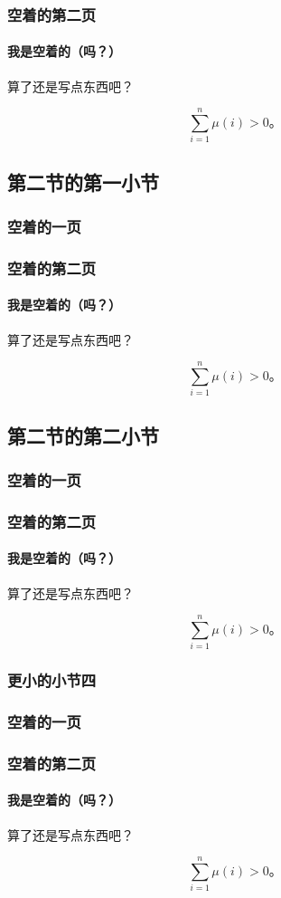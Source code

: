 \documentclass{../pkslide}
\begin{document}
\begin{frame}
  \frametitle{空着的第二页}
  \framesubtitle{我是空着的（吗？）}
  
  算了还是写点东西吧？
  
  \[ \sum_{i = 1}^{n} \mu(i) > 0 \text{。} \]
\end{frame}

\subsection{第二节的第一小节}

\begin{frame}
  \frametitle{空着的一页}
\end{frame}

\begin{frame}
  \frametitle{空着的第二页}
  \framesubtitle{我是空着的（吗？）}
  
  算了还是写点东西吧？
  
  \[ \sum_{i = 1}^{n} \mu(i) > 0 \text{。} \]
\end{frame}

\subsection{第二节的第二小节}

\begin{frame}
  \frametitle{空着的一页}
\end{frame}

\begin{frame}
  \frametitle{空着的第二页}
  \framesubtitle{我是空着的（吗？）}
  
  算了还是写点东西吧？
  
  \[ \sum_{i = 1}^{n} \mu(i) > 0 \text{。} \]
\end{frame}

\subsubsection{更小的小节四}

\begin{frame}
  \frametitle{空着的一页}
\end{frame}

\begin{frame}
  \frametitle{空着的第二页}
  \framesubtitle{我是空着的（吗？）}
  
  算了还是写点东西吧？
  
  \[ \sum_{i = 1}^{n} \mu(i) > 0 \text{。} \]
\end{frame}
\end{document}
